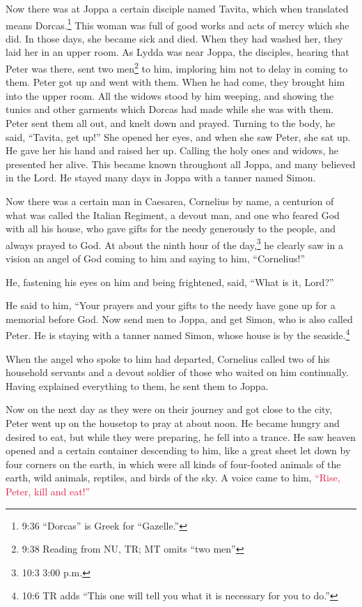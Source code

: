 \myverse{}Now there was at Joppa a certain disciple named Tavita, which
when translated means Dorcas.\footnote{9:36 “Dorcas” is Greek for “Gazelle.”} This woman was full of good works and acts of mercy
which she did.
\myverse{}In those days, she became sick and died. When they had washed her, they laid
her in an upper room.
\myverse{}As Lydda was near Joppa, the disciples, hearing that Peter was there, sent two men\footnote{9:38 Reading from NU, TR; MT omits “two men”} to him, imploring him not to delay in coming to them. \myverse{}Peter got up and went with them. When he had come, they brought him into the upper room. All the widows stood by him weeping, and showing the tunics and other garments which Dorcas had made while she was with them. \myverse{}Peter sent them all out, and knelt down and prayed. Turning to the body, he said, “Tavita, get up!” She opened her eyes, and when she saw Peter, she sat up. \myverse{}He gave her his hand and raised her up. Calling the holy ones and widows, he presented her alive. \myverse{}This became known throughout all Joppa, and many believed in the Lord. \myverse{}He stayed many days in Joppa with a tanner named Simon.


\mychapter{} \myverse*{}Now there was a certain man in Caesarea, Cornelius by name, a
centurion of what was called the Italian Regiment,
\myverse{}a devout man, and one who feared God with all his house, who gave gifts for
the needy generously to the people, and always prayed to God.
\myverse{}At about the ninth hour of the day,\footnote{10:3 3:00 p.m.} he clearly saw in a vision an angel of God coming to him and saying to him,
“Cornelius!”

\myverse{}He, fastening his eyes on him and being frightened, said, “What
is it, Lord?”

He said to him, “Your prayers and your gifts to the needy have gone up for a memorial before
God.
\myverse{}Now send men to Joppa, and get Simon, who is also called Peter.
\myverse{}He is staying with a tanner named Simon, whose house is by the seaside.\footnote{10:6 TR adds “This one will tell you what it is necessary for you to do.”}

\myverse{}When the angel who spoke to him had departed, Cornelius called
two of his household servants and a devout soldier of those who waited on him continually.
\myverse{}Having explained everything to them, he sent them to Joppa.

\myverse{}Now on the next day as they were on their journey and got close
to the city, Peter went up on the housetop to pray at about noon.
\myverse{}He became hungry and desired to eat, but while they were preparing, he fell
into a trance.
\myverse{}He saw heaven opened and a certain container descending to him, like a great
sheet let down by four corners on the earth,
\myverse{}in which were all kinds of four-footed animals of the earth, wild animals,
reptiles, and birds of the sky.
\myverse{}A voice came to him,
\textcolor{crimson}{“Rise, Peter, kill and eat!”}

